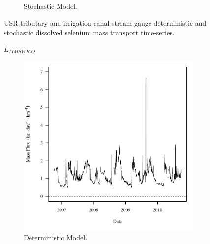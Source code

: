 \begin{linenumbers}
\begin{landscape}
\begin{figure}
\begin{subfigure}{0.7\textwidth}
			\caption{Stochastic Model.}
		\end{subfigure}
		\caption{USR tributary and irrigation canal stream gauge deterministic and stochastic dissolved selenium mass transport time-series.}
	\end{figure}
\end{landscape}
\subfiguremid
\begin{landscape}
	\begin{figure}
		$ \displaystyle L_{TIMSWICO} $
		\begin{subfigure}{0.7\textwidth}
			\centering
			\includegraphics[width=\tableCustomSize]{"Figures/Results_USR/Deterministic/f TIM"}
			\caption{Deterministic Model.}
		\end{subfigure}%
		\begin{subfigure}{0.7\textwidth}
			\centering

\end{subfigure}
\end{figure}
\end{landscape}
\end{linenumbers}
